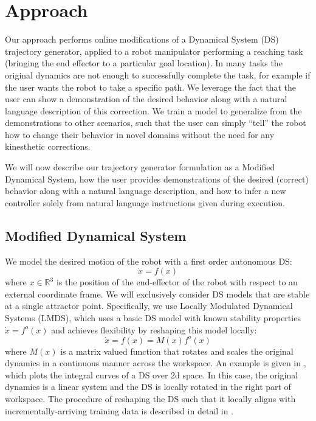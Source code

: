

\section{Approach}
\label{sec:approach}

Our approach performs online modifications of a Dynamical System (DS) trajectory generator, applied to a robot manipulator performing a reaching task (bringing the end effector to a particular goal location).
In many tasks the original dynamics are not enough to successfully complete the task, for example if the user wants the robot to take a specific path.
We leverage the fact that the user can show a demonstration of the desired behavior along with a natural language description of this correction.
We train a model to generalize from the demonstrations to other scenarios, such that the user can simply ``tell'' the robot how to change their behavior in novel domains without the need for any kinesthetic corrections.

We will now describe our trajectory generator formulation as a Modified Dynamical System, how the user provides demonstrations of the desired (correct) behavior along with a natural language description, and how to infer a new controller solely from natural language instructions given during execution.

\subsection{Modified Dynamical System}

We model the desired motion of the robot with a first order autonomous DS:
\begin{equation}
  \label{eq:DS_general}
  \dot x = f(x)
\end{equation}
where $x \in \mathbb{R}^3$ is the position of the end-effector of the robot with respect to an external coordinate frame. We will exclusively consider DS models that are stable at a single attractor point. Specifically, we use Locally Modulated Dynamical Systems (LMDS), which uses a basic DS model with known stability properties $\dot x = f^o(x)$ and achieves flexibility by reshaping this model locally:
\begin{equation}
  \label{eq:DS_reshaped}
  \dot x = f(x) = M(x)f^o(x)
\end{equation}
where $M(x)$ is a matrix valued function that rotates and scales the original dynamics in a continuous manner across the workspace. An example is given in , which plots the integral curves of a DS over 2d space. In this case, the original dynamics is a linear system and the DS is locally rotated in the right part of workspace. The procedure of reshaping the DS such that it locally aligns with incrementally-arriving training data is described in detail in .


